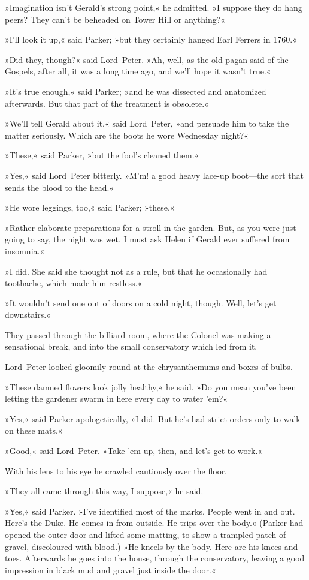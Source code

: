 »Imagination isn't Gerald's strong point,« he admitted. »I suppose they do hang peers? They can't be beheaded on Tower Hill or anything?«

»I'll look it up,« said Parker; »but they certainly hanged Earl Ferrers in 1760.«

»Did they, though?« said Lord~Peter. »Ah, well, as the old pagan said of the Gospels, after all, it was a long time ago, and we'll hope it wasn't true.«

»It's true enough,« said Parker; »and he was dissected and anatomized afterwards. But that part of the treatment is obsolete.«

»We'll tell Gerald about it,« said Lord~Peter, »and persuade him to take the matter seriously. Which are the boots he wore Wednesday night?«

»These,« said Parker, »but the fool's cleaned them.«

»Yes,« said Lord~Peter bitterly. »M'm! a good heavy lace-up boot—the sort that sends the blood to the head.«

»He wore leggings, too,« said Parker; »these.«

»Rather elaborate preparations for a stroll in the garden. But, as you were just going to say, the night was wet. I must ask Helen if Gerald ever suffered from insomnia.«

»I did. She said she thought not as a rule, but that he occasionally had toothache, which made him restless.«

»It wouldn't send one out of doors on a cold night, though. Well, let's get downstairs.«

They passed through the billiard-room, where the Colonel was making a sensational break, and into the small conservatory which led from it.

Lord~Peter looked gloomily round at the chrysanthemums and boxes of bulbs.

»These damned flowers look jolly healthy,« he said. »Do you mean you've been letting the gardener swarm in here every day to water 'em?«

»Yes,« said Parker apologetically, »I did. But he's had strict orders only to walk on these mats.«

»Good,« said Lord~Peter. »Take 'em up, then, and let's get to work.«

With his lens to his eye he crawled cautiously over the floor.

»They all came through this way, I suppose,« he said.

»Yes,« said Parker. »I've identified most of the marks. People went in and out. Here's the Duke. He comes in from outside. He trips over the body.« (Parker had opened the outer door and lifted some matting, to show a trampled patch of gravel, discoloured with blood.) »He kneels by the body. Here are his knees and toes. Afterwards he goes into the house, through the conservatory, leaving a good impression in black mud and gravel just inside the door.«

